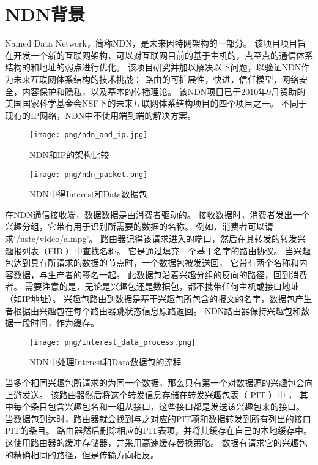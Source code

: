 \chapter{NDN背景}

Named Data Network，简称NDN，是未来因特网架构的一部分。
该项目项目旨在开发一个新的互联网架构，可以对互联网目前的基于主机的，点至点的通信体系结构的和地址的弱点进行优化。
该项目研究并加以解决以下问题，以验证NDN作为未来互联网体系结构的技术挑战：
路由的可扩展性，快进，信任模型，网络安全，内容保护和隐私，以及基本的传播理论。
该NDN项目已于2010年9月资助的美国国家科学基金会NSF下的未来互联网体系结构项目的四个项目之一。
不同于现有的IP网络，NDN中不使用端到端的解决方案。

\begin{figure}
\centering
\texttt{[image: png/ndn\_and\_ip.jpg]}
\caption{NDN和IP的架构比较}
\label{}
\end{figure}

\begin{figure}[]
\centering
\texttt{[image: png/ndn\_packet.png]}
\caption{NDN中得Interest和Data数据包}
\label{}
\end{figure}

在NDN通信接收端，数据数据是由消费者驱动的。
接收数据时，消费者发出一个兴趣分组，它带有用于识别所需要的数据的名称。
例如，消费者可以请求`/ustc/video/a.mpg'。
路由器记得该请求进入的端口，然后在其转发的转发兴趣报列表（FIB ）中查找名称。
它是通过填充一个基于名字的路由协议。
当兴趣包达到具有所请求的数据的节点时，一个数据包被发送回，
它带有两个名称和内容数据，与生产者的签名一起。
此数据包沿着兴趣分组的反向的路径，回到消费者。
需要注意的是，无论是兴趣包还是数据包，都不携带任何主机或接口地址（如IP地址）。
兴趣包路由到数据是基于兴趣包所包含的报文的名字，数据包产生者根据由兴趣包在每个路由器跳状态信息原路返回。
NDN路由器保持兴趣包和数据一段时间，作为缓存。

\begin{figure}
\centering
\texttt{[image: png/interest\_data\_process.png]}
\caption{NDN中处理Interest和Data数据包的流程}
\label{mobility_pic}
\end{figure}

当多个相同兴趣包所请求的为同一个数据，那么只有第一个对数据源的兴趣包会向上游发送。
该路由器然后将这个转发信息存储在转发兴趣包表（ PIT ）中 ，
其中每个条目包含兴趣包名和一组从接口，这些接口都是发送该兴趣包来的接口。
当数据包到达时，路由器就会找到与之对应的PIT项和数据转发到所有列出的接口PIT的条目。
路由器然后删除相应的PIT表项，并将其缓存在自己的本地缓存中。
这使用路由器的缓冲存储器，并采用高速缓存替换策略。
数据有请求它的兴趣包的精确相同的路径，但是传输方向相反。

